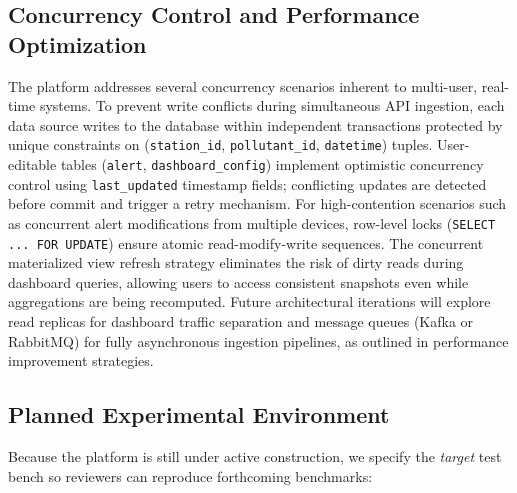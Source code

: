 \subsection{Concurrency Control and Performance Optimization}\label{subsec:concurrency}
The platform addresses several concurrency scenarios inherent to multi-user, real-time systems.  
To prevent write conflicts during simultaneous API ingestion, each data source writes to the database within independent transactions protected by unique constraints on (\texttt{station\_id}, \texttt{pollutant\_id}, \texttt{datetime}) tuples.  
User-editable tables (\texttt{alert}, \texttt{dashboard\_config}) implement optimistic concurrency control using \texttt{last\_updated} timestamp fields; conflicting updates are detected before commit and trigger a retry mechanism.  
For high-contention scenarios such as concurrent alert modifications from multiple devices, row-level locks (\texttt{SELECT ... FOR UPDATE}) ensure atomic read-modify-write sequences.  
The concurrent materialized view refresh strategy eliminates the risk of dirty reads during dashboard queries, allowing users to access consistent snapshots even while aggregations are being recomputed.  
Future architectural iterations will explore read replicas for dashboard traffic separation and message queues (Kafka or RabbitMQ) for fully asynchronous ingestion pipelines, as outlined in performance improvement strategies.

\subsection{Planned Experimental Environment}\label{subsec:experiment}
Because the platform is still under active construction, we specify the \textit{target} test bench so reviewers can reproduce forthcoming benchmarks:

